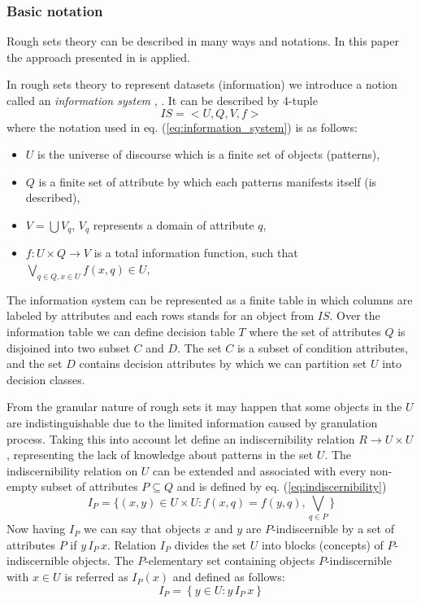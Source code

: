 \subsubsection{Basic notation}
\label{cha:Rough_set_basic_notation}
Rough sets theory can be described in many ways and notations. In this paper
the approach presented in \cite{bib49} is applied. 

In rough sets theory to represent datasets (information) we introduce a notion 
called an \textit{information system} \cite{bib37}, \cite{bib39}. 
It can be described by 4-tuple
\begin{equation}
    IS = <U, Q, V, f >
    \label{eq:information_system}
\end{equation}
where the notation used in eq. (\ref{eq:information_system}) is as follows:
\begin{itemize}
    \item $U$ is the universe of discourse  which is a finite set of objects
        (patterns),
    \item $Q$ is a finite set of attribute by  which each patterns manifests
        itself (is described),
    \item $V = \bigcup V_q$, $V_q$ represents a domain of attribute $q$,
    \item $f:U \times Q \rightarrow V$ is a total information function, such that
        $\bigvee_{q\in Q, x \in U} f(x,q) \in U$,
\end{itemize} 
The information system can be represented as a finite table in which 
columns are labeled by attributes and each rows stands for an object from
$IS$. Over the information table we can define decision table
$T$ where the set of attributes $Q$ is disjoined into two
subset $C$ and $D$. The set $C$ is a subset of 
condition attributes, and the set $D$ contains decision attributes 
by which we can partition set $U$ into decision classes.

From the granular nature of rough sets it may happen that some objects 
in the $U$ are indistinguishable due to the limited information caused by
granulation process. Taking this into account let define an indiscernibility
relation $R \rightarrow U \times U$, representing the 
lack of knowledge about patterns in the set $U$. The indiscernibility relation on
$U$ can be extended and associated with every non-empty subset of attributes $P \subseteq Q$
and is defined by eq. (\ref{eq:indiscernibility})
\begin{equation} 
    I_P = \{ (x, y) \in U \times U: f(x, q) = f(y,q), \bigvee_{q \in P}\}
    \label{eq:indiscernibility}
\end{equation}
Now having $I_P$ we can say that objects $x$ and
$y$ are $P$-indiscernible by a set of attributes $P$ if $y \, I_P \, x$. Relation
$I_P$ divides the set $U$ into blocks (concepts) of $P$-indiscernible objects.
The $P$-elementary set containing objects $P$-indiscernible with $x \in U$ is
referred as $I_P(x)$ and defined as follows:
\begin{equation} 
    I_P = \left\{ y \in U: y \, I_P \, x \right\}
    \label{eq:p_indiscernible}
\end{equation}

